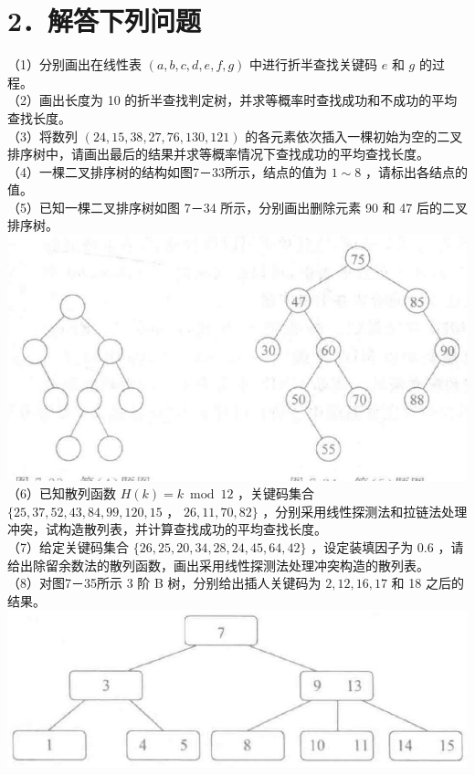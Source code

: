 \documentclass[10pt]{article}
\begin{document}
\section*{2．解答下列问题}
（1）分别画出在线性表 $(a, b, c, d, e, f, g)$ 中进行折半查找关键码 $e$ 和 $g$ 的过程。\\
（2）画出长度为 10 的折半查找判定树，并求等概率时查找成功和不成功的平均查找长度。\\
（3）将数列 $(24,15,38,27,76,130,121)$ 的各元素依次插入一棵初始为空的二叉排序树中，请画出最后的结果并求等概率情况下查找成功的平均查找长度。\\
（4）一棵二叉排序树的结构如图7－33所示，结点的值为 $1 \sim 8$ ，请标出各结点的值。\\
（5）已知一棵二叉排序树如图 7－34 所示，分别画出删除元素 90 和 47 后的二叉排序树。\\
\includegraphics[max width=\textwidth, center]{2025_06_06_704745ea57b15b2333e5g-266(1)}\\
（6）已知散列函数 $H(k)=k \bmod 12$ ，关键码集合 $\{25,37,52,43,84,99,120,15$ ， $26,11,70,82\}$ ，分别采用线性探测法和拉链法处理冲突，试构造散列表，并计算查找成功的平均查找长度。\\
（7）给定关键码集合 $\{26,25,20,34,28,24,45,64,42\}$ ，设定装填因子为 0.6 ，请给出除留余数法的散列函数，画出采用线性探测法处理冲突构造的散列表。\\
（8）对图7－35所示 3 阶 B 树，分别给出插人关键码为 $2,12,16,17$ 和 18 之后的结果。\\
\includegraphics[max width=\textwidth, center]{2025_06_06_704745ea57b15b2333e5g-266}
\end{document}
